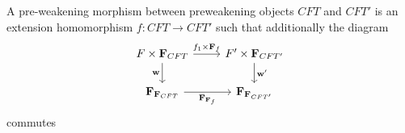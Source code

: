 \begin{comment}
\begin{align*}
w_0 & : F\times F\to F\times_{e_0,c} F\\
w_1 & : F\times(F\times_{e_0,c} F) \to F\times_{e_0,c \circ \pi_2^{e_0,c}} (F\times_{e_0,c}F)\\
w_2 & : F\times(F\times_{e_0,t\circ c} T) \to F\times_{e_0,c}(F\times_{e_0,t\circ c} T)
\end{align*}
for which the following diagrams commute:
\begin{equation*}
\begin{tikzcd}
F\times F \ar{r}{w_0} \ar{dr}[swap]{\pi_1} & F\times_{e_0,c}F \ar{d}{\pi_2^{e_0,c}}\\
& F
\end{tikzcd}
\end{equation*}
\begin{equation*}
\begin{tikzcd}
F\times(F\times_{e_0,c} F) 
  \ar{d}[swap]{\catid{F}\times \pi_2^{e_0,c}}
  \ar{r}{w_1}
  &
F\times_{e_0,c\circ \pi_2^{e_0,c}} (F\times_{e_0,c}F)
  \ar{d}{e_0^\ast(\pi_2^{e_0,c})}
  \\
F\times F
  \ar{r}[swap]{w_0}
  &
F\times_{e_0,c} F
\end{tikzcd}
\end{equation*}
\begin{equation*}
\begin{tikzcd}
F\times(F\times_{e_0,t\circ c} T)
  \ar{r}{w_2}
  \ar{d}[swap]{\catid{F}\times e_0^\ast(t)}
  &
F\times_{e_0,c}(F\times_{e_0,t\circ c} T)
  \ar{d}{e_0^\ast(e_0^\ast(t))}
  \\
F\times(F\times_{e_0,c} F)
  \ar{r}[swap]{w_1}
  &
F\times_{e_0,c\circ \pi_2^{e_0,c}} (F\times_{e_0,c}F)
\end{tikzcd}
\end{equation*}
\end{comment}

\begin{defn}
A pre-weakening morphism between preweakening objects $CFT$ and $CFT'$ is an
extension homomorphism $f:CFT\to CFT'$ such that additionally the diagram
\begin{equation*}
\begin{tikzcd}
F\times \mathbf{F}_{CFT}
  \ar{d}[swap]{\mathbf{w}}
  \ar{r}{f_1\times\mathbf{F}_f}
  &
F'\times\mathbf{F}_{CFT'}
  \ar{d}{\mathbf{w'}}
  \\
\mathbf{F}_{\mathbf{F}_{CFT}}
  \ar{r}[swap]{\mathbf{F}_{\mathbf{F}_f}}
  &
\mathbf{F}_{\mathbf{F}_{CFT'}}
\end{tikzcd}
\end{equation*}
commutes
\end{defn}


